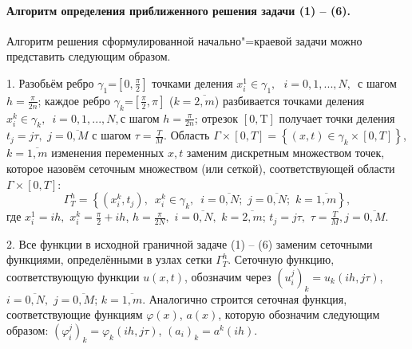 \paragraph{Алгоритм определения приближенного решения задачи (1) – (6).}

Алгоритм решения сформулированной начально"=краевой задачи можно представить следующим образом.

	1. Разобьём ребро ${{\gamma }_{1}}$=$\left[ 0,\frac{\pi }{2} \right]$ точками деления $x_{i}^{1}\in {{\gamma }_{1}},\,\,\,\,i=0,1,...,N,\,\,\, $с шагом $h=\frac{\pi }{2n}$; каждое ребро ${{\gamma }_{k}}$=$ [ \frac{\pi }{2},\pi ]$ ($k=\overline{2,m}$) разбивается точками деления $x_{i}^{k}\in {{\gamma }_{k}},\,\,\,i=0,1,...,N,$с шагом $h=\frac{\pi }{2n}$; отрезок $\left[ 0,\text{T} \right]$ получает точки деления ${{t}_{j}}=j\tau ,$ $j=\overline{0,M}$ с шагом $\tau =\frac{T}{M}$. Область $\Gamma\times [0,T]=\left\{ (x,t)\in {{\gamma }_{k}}\times [0,T] \right\}$, $k=\overline{1,m}$ изменения переменных $x,t$ заменим дискретным множеством точек, которое назовём сеточным множеством (или сеткой), соответствующей области $\Gamma\times [0,T]$:
\[\Gamma_{T}^{h}=\left\{ \left( x_{i}^{k},{{t}_{j}} \right),\,\,\,x_{i}^{k}\in {{\gamma }_{k}},\,\,\,i=\overline{0,N};\,\,j=\overline{0,N};\,\,k=\overline{1,m} \right\},\]
где $x_{i}^{1}=ih,$ $x_{i}^{k}=\frac{\pi }{2}+ih$, $h=\frac{\pi }{2N},$ $i=\overline{0,N},$ $k=\overline{2,m}$; ${{t}_{j}}=j\tau ,$ $\tau =\frac{T}{M},$$j=\overline{0,M}$.

	2. Все функции в исходной граничной задаче (1) – (6) заменим сеточными функциями, определёнными в узлах сетки $\Gamma_{T}^{h}$. Сеточную функцию, соответствующую функции $u(x,t)$, обозначим через ${{\left( u_{i}^{j} \right)}_{k}}={{u}_{k}}(ih,j\tau )$, $i=\overline{0,N},$ $j=\overline{0,M}$; $k=\overline{1,m}$. Аналогично строится сеточная функция, соответствующие функциям $\varphi (x)$, $a(x)$, которую обозначим следующим образом: ${{\left( \varphi _{i}^{j} \right)}_{k}}={{\varphi }_{k}}(ih,j\tau )$, ${{({{a}_{i}})}_{k}}={{a}^{k}}(ih)$.

